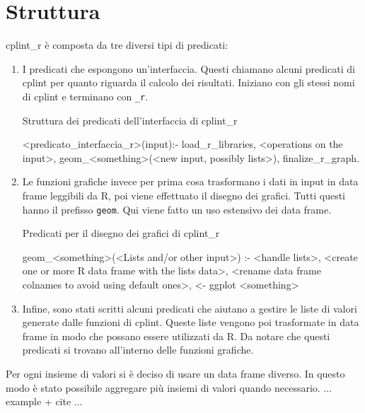\documentclass[10pt,titlepage,twoside,a4paper]{report}
\newenvironment{code}{\singlespacing\captionsetup{type=listing}}{}
\begin{document}
\section{Struttura}
cplint\_r è composta da tre diversi tipi di predicati:
\begin{enumerate}
    \item I predicati che espongono un'interfaccia. Questi chiamano alcuni 
          predicati di cplint per quanto riguarda il calcolo dei risultati. 
Iniziano con gli stessi nomi di cplint e terminano con \texttt{\_r}.

        \begin{code}
            \caption{Struttura dei predicati dell'interfaccia di cplint\_r}
            \begin{prologcode*}{}
<predicato_interfaccia_r>(input):-
    load_r_libraries,
    <operations on the input>,
    geom_<something>(<new input, possibly lists>),
    finalize_r_graph.
            \end{prologcode*}
        \end{code}
    \item Le funzioni grafiche invece per prima cosa trasformano i dati in 
          input in data frame leggibili da R, poi viene effettuato il disegno 
          dei grafici. Tutti questi hanno il prefisso \texttt{geom}. Qui viene 
fatto un uso estensivo dei data frame.

    \begin{code}
        \caption{Predicati per il disegno dei grafici di cplint\_r}
        \begin{prologcode*}{}
geom_<something>(<Lists and/or other input>) :-
    <handle lists>,
    <create one or more R data frame with the lists data>,
    <rename data frame colnames to avoid using default ones>,
    <- ggplot <something>
        \end{prologcode*}
    \end{code}
    \item Infine, sono stati scritti alcuni predicati che aiutano a gestire le 
          liste di valori generate dalle funzioni di cplint. Queste liste 
          vengono poi trasformate in data frame in modo che possano 
          essere utilizzati da R. Da notare che questi predicati si trovano 
          all'interno delle funzioni grafiche.
\end{enumerate}

Per ogni insieme di valori si è deciso di usare un data frame diverso. In 
questo modo è stato possibile aggregare più insiemi di valori quando 
necessario. ... example + cite ...
\end{document}
